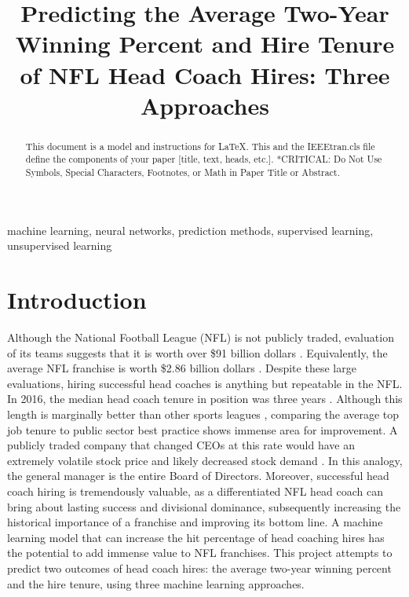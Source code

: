 \documentclass[conference]{IEEEtran}
\begin{document}
\title{Predicting the Average Two-Year Winning Percent and Hire Tenure of NFL Head Coach Hires: Three Approaches}

\author{
}

\maketitle

\begin{abstract}
This document is a model and instructions for \LaTeX.
This and the IEEEtran.cls file define the components of your paper [title, text, heads, etc.]. *CRITICAL: Do Not Use Symbols, Special Characters, Footnotes, 
or Math in Paper Title or Abstract.
\end{abstract}

\begin{IEEEkeywords}
machine learning, neural networks, prediction methods, supervised learning, unsupervised learning
\end{IEEEkeywords}

\section{Introduction}
Although the National Football League (NFL) is not publicly traded, evaluation of its teams suggests that it is worth over \$91 billion dollars \cite{b1}.  Equivalently, the average NFL franchise is worth \$2.86 billion dollars \cite{b1}. Despite these large evaluations, hiring successful head coaches is anything but repeatable in the NFL. In 2016, the median head coach tenure in position was three years \cite{b2}. Although this length is marginally better than other sports leagues \cite{b2}, comparing the average top job tenure to public sector best practice shows immense area for improvement. A publicly traded company that changed CEOs at this rate would have an extremely volatile stock price and likely decreased stock demand \cite{b3}. In this analogy, the general manager is the entire Board of Directors. Moreover, successful head coach hiring is tremendously valuable, as a differentiated NFL head coach can bring about lasting success and divisional dominance, subsequently increasing the historical importance of a franchise and improving its bottom line. A machine learning model that can increase the hit percentage of head coaching hires has the potential to add immense value to NFL franchises. This project attempts to predict two outcomes of head coach hires: the average two-year winning percent and the hire tenure, using three machine learning approaches.
\end{document}
